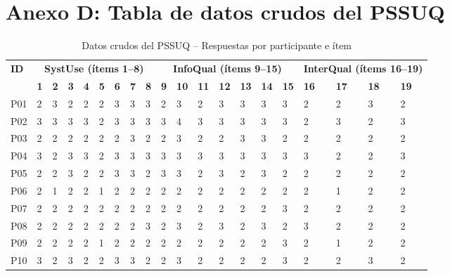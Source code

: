 \documentclass[a4paper,12pt]{report}
\begin{document}
\newpage

\section*{Anexo D: Tabla de datos crudos del PSSUQ}

\begin{table}[H]
    \centering
    \scriptsize
    \caption{Datos crudos del PSSUQ -- Respuestas por participante e ítem}
    \label{tab:datos_crudos_pssuq}
    \begin{tabular}{p{0.6cm} p{0.5cm} p{0.5cm} p{0.5cm} p{0.5cm} p{0.5cm} p{0.5cm} p{0.5cm} p{0.5cm} p{0.5cm} p{0.5cm} p{0.5cm} p{0.5cm} p{0.5cm} p{0.5cm} p{0.5cm} p{0.5cm} p{0.5cm} p{0.5cm} p{0.5cm}}
        \toprule
        \multirow{2}{*}{\textbf{ID}} & \multicolumn{8}{c}{\textbf{SystUse (ítems 1--8)}} & \multicolumn{7}{c}{\textbf{InfoQual (ítems 9--15)}} & \multicolumn{4}{c}{\textbf{InterQual (ítems 16--19)}} \\
        \cmidrule(lr){2-9} \cmidrule(lr){10-16} \cmidrule(lr){17-20}
        & \textbf{1} & \textbf{2} & \textbf{3} & \textbf{4} & \textbf{5} & \textbf{6} & \textbf{7} & \textbf{8} & \textbf{9} & \textbf{10} & \textbf{11} & \textbf{12} & \textbf{13} & \textbf{14} & \textbf{15} & \textbf{16} & \textbf{17} & \textbf{18} & \textbf{19} \\
        \midrule
        P01 & 2 & 3 & 2 & 2 & 2 & 3 & 3 & 3 & 2 & 3 & 2 & 3 & 3 & 3 & 3 & 2 & 2 & 3 & 2 \\
        P02 & 3 & 3 & 3 & 3 & 2 & 3 & 3 & 3 & 3 & 4 & 3 & 3 & 3 & 3 & 3 & 2 & 3 & 2 & 3 \\
        P03 & 2 & 2 & 2 & 2 & 2 & 2 & 3 & 2 & 2 & 3 & 2 & 2 & 3 & 3 & 2 & 2 & 2 & 2 & 2 \\
        P04 & 3 & 2 & 3 & 3 & 2 & 3 & 3 & 3 & 3 & 3 & 3 & 3 & 3 & 3 & 3 & 3 & 2 & 2 & 3 \\
        P05 & 2 & 2 & 3 & 2 & 2 & 3 & 3 & 2 & 3 & 3 & 2 & 3 & 2 & 3 & 2 & 2 & 2 & 2 & 2 \\
        P06 & 2 & 1 & 2 & 2 & 1 & 2 & 2 & 2 & 2 & 2 & 2 & 2 & 2 & 2 & 2 & 2 & 1 & 2 & 2 \\
        P07 & 2 & 2 & 2 & 2 & 2 & 2 & 2 & 2 & 2 & 2 & 2 & 2 & 2 & 2 & 3 & 2 & 2 & 2 & 2 \\
        P08 & 2 & 2 & 2 & 2 & 2 & 2 & 2 & 3 & 2 & 3 & 2 & 3 & 2 & 3 & 2 & 3 & 2 & 2 & 2 \\
        P09 & 2 & 2 & 2 & 2 & 1 & 2 & 2 & 2 & 2 & 2 & 2 & 2 & 2 & 2 & 3 & 2 & 1 & 2 & 2 \\
        P10 & 3 & 2 & 3 & 2 & 2 & 3 & 3 & 2 & 2 & 3 & 2 & 2 & 2 & 2 & 3 & 2 & 2 & 3 & 2 \\
        \bottomrule
    \end{tabular}
\end{table}
\end{document}
